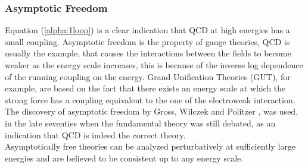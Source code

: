 \subsubsection{Asymptotic Freedom}
Equation (\ref{alpha:1loop}) is a clear indication that QCD at high energies has a small coupling. Asymptotic freedom is the property of gauge theories, QCD is usually the example, that causes the interactions between the fields to become weaker as the energy scale increases, this is because of the inverse log dependence of the running coupling on the energy. Grand Unification Theories (GUT), for example, are based on the fact that there exists an energy scale at which the strong force has a coupling equivalent to the one of the electroweak interaction.  \\
The discovery of asymptotic freedom by Gross, Wilczek and Politzer \cite{Gross-Wilczek, Politzer},  was used, in the late seventies when the fundamental theory was still debated, as an indication that QCD is indeed the correct theory.\\
Asymptotically free theories can be analyzed perturbatively at sufficiently large energies and are believed to be consistent up to any energy scale.

